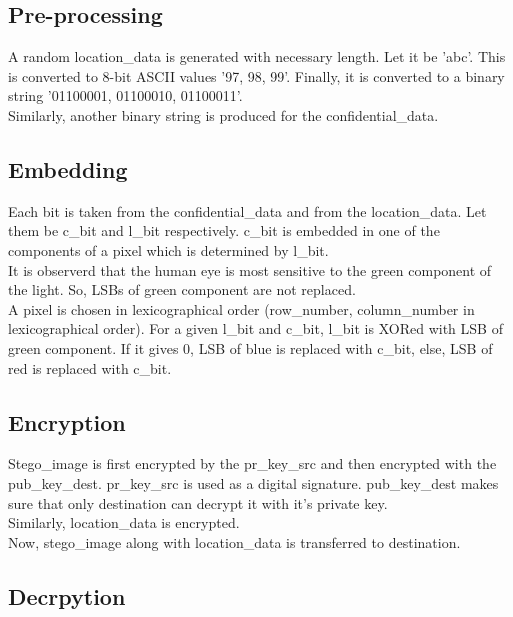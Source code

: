 \documentclass[conference]{IEEEtran}
\begin{document}
\subsection{Pre-processing}
A random location\_data is generated with necessary length. Let it be 'abc'.
This is converted to 8-bit ASCII values '97, 98, 99'.
Finally, it is converted to a binary string '01100001, 01100010, 01100011'.\\

Similarly, another binary string is produced for the confidential\_data.\\

\subsection{Embedding}
Each bit is taken from the confidential\_data and from the location\_data.
Let them be c\_bit and l\_bit respectively.
c\_bit is embedded in one of the components of a pixel which is determined by l\_bit.\\

It is observerd that the human eye is most sensitive to the green component of the light.
So, LSBs of green component are not replaced.\\

A pixel is chosen in lexicographical order (row\_number, column\_number in lexicographical order).
For a given l\_bit and c\_bit, l\_bit is XORed with LSB of green component.
If it gives 0, LSB of blue is replaced with c\_bit, else, LSB of red is replaced with c\_bit.\\

\subsection{Encryption}
Stego\_image is first encrypted by the pr\_key\_src and then encrypted with the pub\_key\_dest.
pr\_key\_src is used as a digital signature.
pub\_key\_dest makes sure that only destination can decrypt it with it's private key.\\

Similarly, location\_data is encrypted.\\

Now, stego\_image along with location\_data is transferred to destination.

\subsection{Decrpytion}
\end{document}
